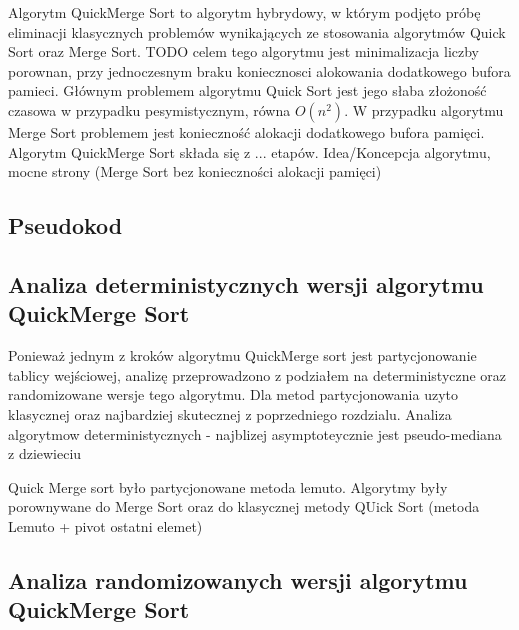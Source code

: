 Algorytm QuickMerge Sort to algorytm hybrydowy, w którym podjęto próbę eliminacji klasycznych problemów wynikających ze stosowania algorytmów Quick Sort oraz Merge Sort. 
TODO celem tego algorytmu jest minimalizacja liczby porownan, przy jednoczesnym braku koniecznosci alokowania dodatkowego bufora pamieci.
Głównym problemem algorytmu Quick Sort jest jego słaba złożoność czasowa w przypadku pesymistycznym, równa $O(n^2)$.  W przypadku algorytmu Merge Sort problemem jest konieczność alokacji dodatkowego bufora pamięci.\\ 

Algorytm QuickMerge Sort składa się z ... etapów.
Idea/Koncepcja algorytmu, mocne strony (Merge Sort bez konieczności alokacji pamięci)

\subsection{Pseudokod}

\subsection{Analiza deterministycznych wersji algorytmu QuickMerge Sort}
Ponieważ jednym z kroków algorytmu QuickMerge sort jest partycjonowanie tablicy wejściowej, analizę przeprowadzono z podziałem na deterministyczne oraz randomizowane wersje tego algorytmu.
Dla metod partycjonowania uzyto klasycznej oraz najbardziej skutecznej z poprzedniego rozdzialu.
Analiza algorytmow deterministycznych - najblizej asymptoteycznie jest pseudo-mediana z dziewieciu

Quick Merge sort było partycjonowane metoda lemuto.
Algorytmy były porownywane do Merge Sort oraz do klasycznej metody QUick Sort (metoda Lemuto + pivot ostatni elemet)

\begin{figure}[]
	\centering
	
	\caption[]{}
	\label{fig:quick-merge-sort-deterministic-pivot-random}
\end{figure}

\subsection{Analiza randomizowanych wersji algorytmu QuickMerge Sort}

